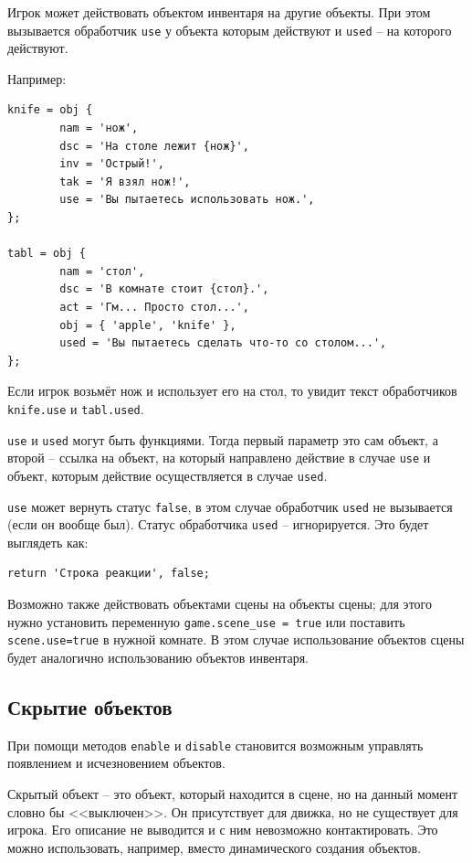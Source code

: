 \documentclass[12pt]{article}
\begin{document}
Игрок может действовать объектом инвентаря на другие объекты. При этом вызывается обработчик \verb/use/ у объекта которым действуют и \verb/used/ -- на которого действуют.

Например:

\begin{verbatim}
knife = obj {
        nam = 'нож',
        dsc = 'На столе лежит {нож}',
        inv = 'Острый!',
        tak = 'Я взял нож!',
        use = 'Вы пытаетесь использовать нож.',
};

tabl = obj {
        nam = 'стол',
        dsc = 'В комнате стоит {стол}.',
        act = 'Гм... Просто стол...',
        obj = { 'apple', 'knife' },
        used = 'Вы пытаетесь сделать что-то со столом...',
};
\end{verbatim}

Если игрок возьмёт нож и использует его на стол, то увидит текст обработчиков \verb/knife.use/ и \verb/tabl.used/.

\verb/use/ и \verb/used/ могут быть функциями. Тогда первый параметр это сам объект, а второй -- ссылка на объект, на который направлено действие в случае \verb/use/ и объект, которым действие осуществляется в случае \verb/used/.

\verb/use/ может вернуть статус \verb/false/, в этом случае обработчик \verb/used/ не вызывается (если он вообще был). Статус обработчика \verb/used/ -- игнорируется. Это будет выглядеть как:

\begin{verbatim}
return 'Строка реакции', false;
\end{verbatim}

Возможно также действовать объектами сцены на объекты сцены; для этого нужно установить переменную \verb/game.scene_use = true/ или поставить \verb/scene.use=true/ в нужной комнате. В этом случае использование объектов сцены будет аналогично использованию объектов инвентаря.

\subsection{Скрытие объектов}


При помощи методов \verb/enable/ и \verb/disable/ становится возможным управлять появлением и исчезновением объектов.

Скрытый объект -- это объект, который находится в сцене, но на данный момент словно бы <<выключен>>. Он присутствует для движка, но не существует для игрока. Его описание не выводится и с ним невозможно контактировать. Это можно использовать, например, вместо динамического создания объектов.
\end{document}
